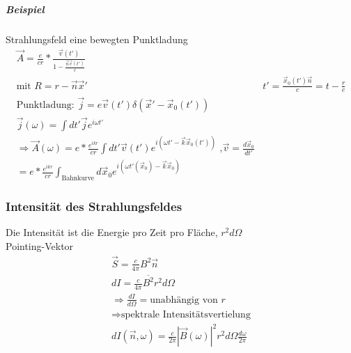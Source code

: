 \documentclass[a4paper]{article}
\begin{document}
\subparagraph{Beispiel}
Strahlungsfeld eine bewegten Punktladung
\begin{align}
\vec{A}=\frac{e}{cr}*\frac{\vec{v}(t')}{1-\frac{\vec{n}\vec{v}(t')}{c}}\\
\text{mit }R=r-\vec{n}\vec{x}' &
t'=\frac{\vec{x}_0(t')\vec{n}}{c}=t-\frac{r}{c}\\
\text{Punktladung: } \vec{j}=e\vec{v}(t')\delta(\vec{x}'-\vec{x}_0(t'))\\
\vec{j}(\omega)=\int dt' \vec{j} e^{i\omega t'}\\
\Rightarrow \vec{A}(\omega)=e*\frac{e^{ikr}}{cr}\int dt' \vec{v}(t')e^{i\left(
\omega t'-\vec{k}\vec{x}_0(t') \right)}\text{ ,
}\vec{v}=\frac{d\vec{x}_0}{dt'}\\
=e*\frac{e^{ikr}}{cr}\int_{\text{Bahnkurve}} d\vec{x}_0 e^{i\left(
\omega t'(\vec{x}_0)-\vec{k}\vec{x}_0 \right)}
\end{align}
\subsubsection{Intensität des Strahlungsfeldes}
Die Intensität ist die Energie pro Zeit pro Fläche, $r^2d\Omega$\\
Pointing-Vektor 
\begin{align}
\vec{S}=\frac{c}{4\pi}B^2\vec{n}\\
dI=\frac{c}{4\pi}\overline{B^2}r^2d\Omega\\
\Rightarrow \frac{dI}{d\Omega}= \text{unabhängig von }r\\
\Rightarrow \text{spektrale Intensitätsvertielung}\\
dI(\vec{n},\omega)=\frac{c}{2\pi}|\vec{B}(\omega)|^2r^2d\Omega
\frac{d\omega}{2\pi}
\end{align} 
\end{document}
